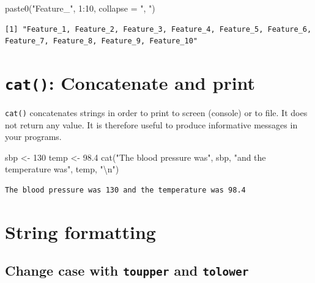 \documentclass[
]{book}
\newenvironment{Shaded}{\begin{snugshade}}{\end{snugshade}}
\newcommand{\AttributeTok}[1]{\textcolor[rgb]{0.77,0.63,0.00}{#1}}
\newcommand{\DecValTok}[1]{\textcolor[rgb]{0.00,0.00,0.81}{#1}}
\newcommand{\FloatTok}[1]{\textcolor[rgb]{0.00,0.00,0.81}{#1}}
\newcommand{\FunctionTok}[1]{\textcolor[rgb]{0.00,0.00,0.00}{#1}}
\newcommand{\NormalTok}[1]{#1}
\newcommand{\OtherTok}[1]{\textcolor[rgb]{0.56,0.35,0.01}{#1}}
\newcommand{\SpecialCharTok}[1]{\textcolor[rgb]{0.00,0.00,0.00}{#1}}
\newcommand{\StringTok}[1]{\textcolor[rgb]{0.31,0.60,0.02}{#1}}
\begin{document}
\begin{Shaded}
\begin{Highlighting}[]
\FunctionTok{paste0}\NormalTok{(}\StringTok{"Feature\_"}\NormalTok{, }\DecValTok{1}\SpecialCharTok{:}\DecValTok{10}\NormalTok{, }\AttributeTok{collapse =} \StringTok{", "}\NormalTok{)}
\end{Highlighting}
\end{Shaded}

\begin{verbatim}
[1] "Feature_1, Feature_2, Feature_3, Feature_4, Feature_5, Feature_6, Feature_7, Feature_8, Feature_9, Feature_10"
\end{verbatim}

\hypertarget{cat-concatenate-and-print}{%
\section{\texorpdfstring{\texttt{cat()}: Concatenate and \textbf{print}}{cat(): Concatenate and print}}\label{cat-concatenate-and-print}}

\texttt{cat()} concatenates strings in order to print to screen (console) or to file. It does not return any value. It is therefore useful to produce informative messages in your programs.

\begin{Shaded}
\begin{Highlighting}[]
\NormalTok{sbp }\OtherTok{\textless{}{-}} \DecValTok{130}
\NormalTok{temp }\OtherTok{\textless{}{-}} \FloatTok{98.4}
\FunctionTok{cat}\NormalTok{(}\StringTok{"The blood pressure was"}\NormalTok{, sbp, }\StringTok{"and the temperature was"}\NormalTok{, temp, }\StringTok{"}\SpecialCharTok{\textbackslash{}n}\StringTok{"}\NormalTok{)}
\end{Highlighting}
\end{Shaded}

\begin{verbatim}
The blood pressure was 130 and the temperature was 98.4 
\end{verbatim}

\hypertarget{string-formatting}{%
\section{String formatting}\label{string-formatting}}

\hypertarget{change-case-with-toupper-and-tolower}{%
\subsection{\texorpdfstring{Change case with \texttt{toupper} and \texttt{tolower}}{Change case with toupper and tolower}}\label{change-case-with-toupper-and-tolower}}
\end{document}
